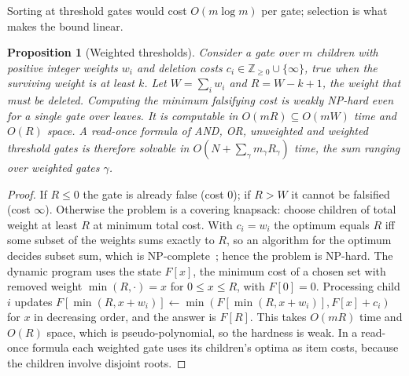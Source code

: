 \documentclass[pdflatex,sn-mathphys-num]{sn-jnl}%
\theoremstyle{plain}
\newtheorem{proposition}[theorem]{Proposition}
\theoremstyle{definition}
\begin{document}
Sorting at threshold gates would cost $O(m\log m)$ per gate; selection is what makes the bound linear.

\begin{proposition}[Weighted thresholds]\label{prop:weighted}
Consider a gate over $m$ children with positive integer weights $w_i$ and deletion costs $c_i\in\mathbb{Z}_{\ge0}\cup\{\infty\}$, true when the surviving weight is at least $k$. Let $W=\sum_iw_i$ and $R=W-k+1$, the weight that must be deleted. Computing the minimum falsifying cost is weakly NP-hard even for a single gate over leaves. It is computable in $O(mR)\subseteq O(mW)$ time and $O(R)$ space. A read-once formula of AND, OR, unweighted and weighted threshold gates is therefore solvable in $O(N+\sum_{\gamma}m_\gamma R_\gamma)$ time, the sum ranging over weighted gates $\gamma$.
\end{proposition}
\begin{proof}
If $R\le0$ the gate is already false (cost $0$); if $R>W$ it cannot be falsified (cost $\infty$). Otherwise the problem is a covering knapsack: choose children of total weight at least $R$ at minimum total cost. With $c_i=w_i$ the optimum equals $R$ iff some subset of the weights sums exactly to $R$, so an algorithm for the optimum decides subset sum, which is NP-complete~\cite{karp1972}; hence the problem is NP-hard. The dynamic program uses the state $F[x]$, the minimum cost of a chosen set with removed weight $\min(R,\cdot)=x$ for $0\le x\le R$, with $F[0]=0$. Processing child $i$ updates $F[\min(R,x+w_i)]\leftarrow\min(F[\min(R,x+w_i)],F[x]+c_i)$ for $x$ in decreasing order, and the answer is $F[R]$. This takes $O(mR)$ time and $O(R)$ space, which is pseudo-polynomial, so the hardness is weak. In a read-once formula each weighted gate uses its children's optima as item costs, because the children involve disjoint roots.
\end{proof}
\end{document}
